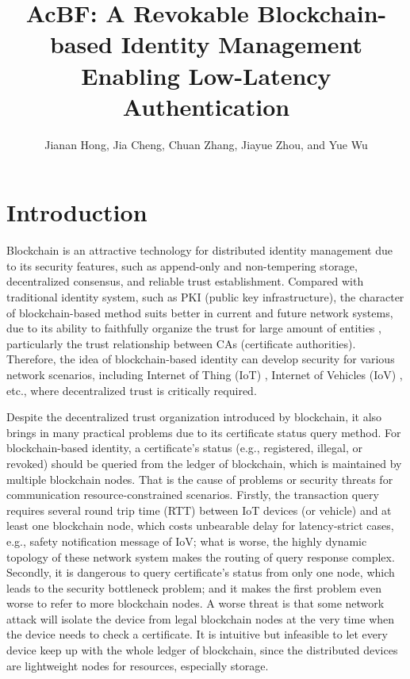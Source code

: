 \documentclass[conference]{IEEEtran}
\title{AcBF: A Revokable Blockchain-based Identity Management Enabling Low-Latency Authentication}
\author{Jianan Hong, Jia Cheng, Chuan Zhang, Jiayue Zhou, and Yue Wu}
\begin{document}
\maketitle

\section{Introduction}
Blockchain is an attractive technology for distributed identity management \cite{9075663} due to its security features, such as append-only and non-tempering storage, decentralized consensus, and reliable trust establishment. Compared with traditional identity system, such as PKI (public key infrastructure), the character of blockchain-based method suits better in current and future network systems, due to its ability to faithfully organize the trust for large amount of entities \cite{certchain2018,yang2018blockchain}, particularly the trust relationship between CAs (certificate authorities). 
Therefore, the idea of blockchain-based identity can develop security for various network scenarios, including Internet of Thing (IoT) \cite{zhangBPAFBlockchainEnabledReliable2022a}, Internet of Vehicles (IoV)  \cite{8010820,singh2018branch}, etc., where decentralized trust is critically required. 

Despite the decentralized trust organization introduced by blockchain, it also brings in many practical problems due to its certificate status query method. For blockchain-based identity, a certificate's status (e.g., registered, illegal, or revoked) should be queried from the ledger of blockchain, which is maintained by multiple blockchain nodes. That is the cause of problems or security threats for communication resource-constrained scenarios. Firstly, the transaction query requires several round trip time (RTT) between IoT devices (or vehicle) and at least one blockchain node, which costs unbearable delay for latency-strict cases, e.g., safety notification message of IoV; what is worse, the highly dynamic topology of these network system makes the routing of query response complex. Secondly, it is dangerous to  query certificate's status from only one node, which leads to the security bottleneck problem; and it makes the first problem even worse to refer to more blockchain nodes. A worse threat is that some network attack will isolate the device from legal blockchain nodes at the very time when the device needs to check a certificate. 
It is intuitive but infeasible to let every device keep up with the whole ledger of blockchain, since the distributed devices are lightweight nodes for resources, especially storage. 
\end{document}
